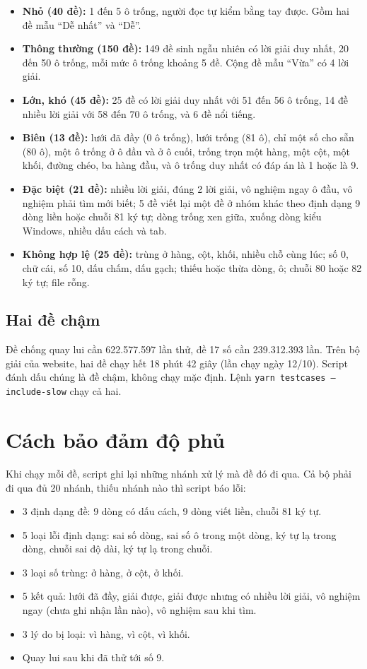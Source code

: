 \begin{itemize}
  \item \textbf{Nhỏ (40 đề):} 1 đến 5 ô trống, người đọc tự kiểm bằng tay được. Gồm hai đề mẫu ``Dễ nhất'' và ``Dễ''.
  \item \textbf{Thông thường (150 đề):} 149 đề sinh ngẫu nhiên có lời giải duy nhất, 20 đến 50 ô trống, mỗi mức ô trống khoảng 5 đề. Cộng đề mẫu ``Vừa'' có 4 lời giải.
  \item \textbf{Lớn, khó (45 đề):} 25 đề có lời giải duy nhất với 51 đến 56 ô trống, 14 đề nhiều lời giải với 58 đến 70 ô trống, và 6 đề nổi tiếng.
  \item \textbf{Biên (13 đề):} lưới đã đầy (0 ô trống), lưới trống (81 ô), chỉ một số cho sẵn (80 ô), một ô trống ở ô đầu và ở ô cuối, trống trọn một hàng, một cột, một khối, đường chéo, ba hàng đầu, và ô trống duy nhất có đáp án là 1 hoặc là 9.
  \item \textbf{Đặc biệt (21 đề):} nhiều lời giải, đúng 2 lời giải, vô nghiệm ngay ô đầu, vô nghiệm phải tìm mới biết; 5 đề viết lại một đề ở nhóm khác theo định dạng 9 dòng liền hoặc chuỗi 81 ký tự; dòng trống xen giữa, xuống dòng kiểu Windows, nhiều dấu cách và tab.
  \item \textbf{Không hợp lệ (25 đề):} trùng ở hàng, cột, khối, nhiều chỗ cùng lúc; số 0, chữ cái, số 10, dấu chấm, dấu gạch; thiếu hoặc thừa dòng, ô; chuỗi 80 hoặc 82 ký tự; file rỗng.
\end{itemize}

\subsection*{Hai đề chậm}
\label{sec:slow-cases}

Đề chống quay lui cần 622.577.597 lần thử, đề 17 số cần 239.312.393 lần. Trên bộ giải của website, hai đề chạy hết 18 phút 42 giây (lần chạy ngày 12/10). Script đánh dấu chúng là đề chậm, không chạy mặc định. Lệnh \texttt{yarn testcases --include-slow} chạy cả hai.

\section{Cách bảo đảm độ phủ}

Khi chạy mỗi đề, script ghi lại những nhánh xử lý mà đề đó đi qua. Cả bộ phải đi qua đủ 20 nhánh, thiếu nhánh nào thì script báo lỗi:

\begin{itemize}
  \item 3 định dạng đề: 9 dòng có dấu cách, 9 dòng viết liền, chuỗi 81 ký tự.
  \item 5 loại lỗi định dạng: sai số dòng, sai số ô trong một dòng, ký tự lạ trong dòng, chuỗi sai độ dài, ký tự lạ trong chuỗi.
  \item 3 loại số trùng: ở hàng, ở cột, ở khối.
  \item 5 kết quả: lưới đã đầy, giải được, giải được nhưng có nhiều lời giải, vô nghiệm ngay (chưa ghi nhận lần nào), vô nghiệm sau khi tìm.
  \item 3 lý do bị loại: vì hàng, vì cột, vì khối.
  \item Quay lui sau khi đã thử tới số 9.
\end{itemize}

